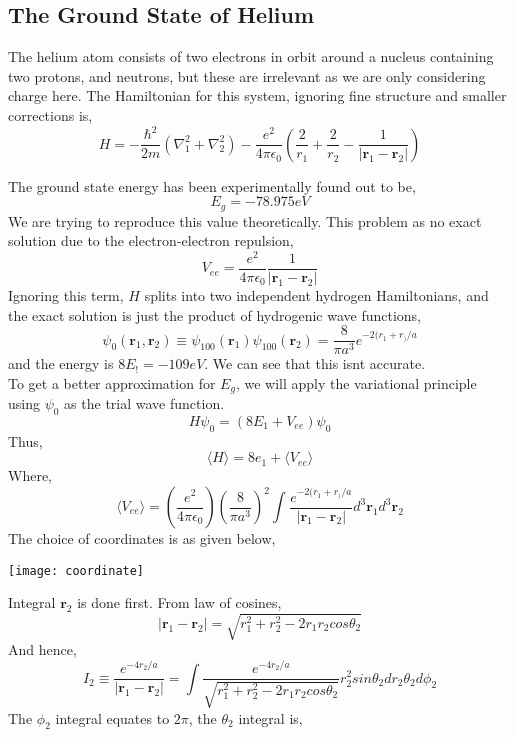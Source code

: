 \subsection{The Ground State of Helium}
The helium atom consists of two electrons in orbit around a nucleus containing two protons, and neutrons, but these are irrelevant as we are only considering charge here. The Hamiltonian for this system, ignoring fine structure and smaller corrections is,
\begin{equation}
	H=-\frac{\hbar^2}{2m}(\nabla^2_1+\nabla^2_2)-\frac{e^2}{4\pi\epsilon_0}\left(\frac{2}{r_1}+\frac{2}{r_2}-\frac{1}{|\textbf{r}_1-\textbf{r}_2|}\right)
\end{equation}

The ground state energy has been experimentally found out to be,
\begin{equation*}
	E_g=-78.975eV
\end{equation*}
We are trying to reproduce this value theoretically. This problem as no exact solution due to the electron-electron repulsion,
\begin{equation}
	V_{ee}=\frac{e^2}{4\pi\epsilon_0}\frac{1}{|\textbf{r}_1-\textbf{r}_2|}
\end{equation}
Ignoring this term, $H$ splits into two independent hydrogen Hamiltonians, and the exact solution is just the product of hydrogenic wave functions,
\begin{equation}
	\psi_0(\textbf{r}_1,\textbf{r}_2)\equiv\psi_{100}(\textbf{r}_1)\psi_{100}(\textbf{r}_2)=\frac{8}{\pi a^3}e^{-2(r_1+r_)/a}
\end{equation}
and the energy is $8E_!=-109 eV$. We can see that this isnt accurate.\\
To get a better approximation for $E_g$, we will apply the variational principle using $\psi_0$ as the trial wave function.
\begin{equation}
	H\psi_0=(8E_1+V_{ee})\psi_0
\end{equation}
Thus,
\begin{equation}
	\langle H\rangle=8e_1+\langle V_{ee}\rangle
\end{equation}
Where,
\begin{equation}
	\langle V_{ee}\rangle=\left(\frac{e^2}{4\pi\epsilon_0}\right)\left(\frac{8}{\pi a^3} \right)^2\int_{}^{}\frac{e^{-2(r_1+r_)/a}}{|\textbf{r}_1-\textbf{r}_2|}d^3\textbf{r}_1d^3\bm{r}_2
\end{equation}
\newpage
The choice of coordinates is as given below,
\begin{center}
	\texttt{[image: coordinate]}
\end{center}
Integral $\bm{r}_2$ is done first. From law of cosines,
\begin{equation}
	|\textbf{r}_1-\textbf{r}_2|=\sqrt{r_1^2+r_2^2-2r_1r_2cos\theta_2}
\end{equation}
And hence,
\begin{equation}
	I_2\equiv\frac{e^{-4r_2/a}}{|\textbf{r}_1-\textbf{r}_2|}=\int\frac{e^{-4r_2/a}}{\sqrt{r_1^2+r_2^2-2r_1r_2cos\theta_2}}r_2^2sin\theta_2dr_2\theta_2d\phi_2
\end{equation}
The $\phi_2$ integral equates to $2\pi$, the $\theta_2$ integral is,

